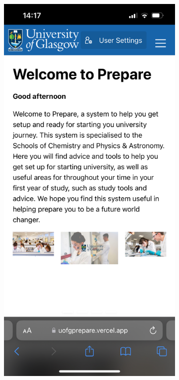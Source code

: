 \documentclass{l4proj}
\begin{document}
\begin{figure}[ht]
    \centering
    \begin{subfigure}[b]{0.3\textwidth}
        \includegraphics[width=\textwidth]{images/mobileHome.pdf}

\end{subfigure}
\end{figure}
\end{document}

